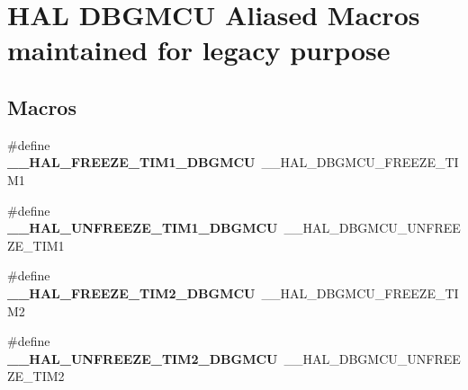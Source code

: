 \hypertarget{group___h_a_l___d_b_g_m_c_u___aliased___macros}{\section{H\-A\-L D\-B\-G\-M\-C\-U Aliased Macros maintained for legacy purpose}
\label{group___h_a_l___d_b_g_m_c_u___aliased___macros}
}
\subsection*{Macros}
\begin{DoxyCompactItemize}
\item 
\hypertarget{group___h_a_l___d_b_g_m_c_u___aliased___macros_gac0c5e626811757be9054cdeef7df4980}{\#define {\bfseries \-\_\-\-\_\-\-H\-A\-L\-\_\-\-F\-R\-E\-E\-Z\-E\-\_\-\-T\-I\-M1\-\_\-\-D\-B\-G\-M\-C\-U}~\-\_\-\-\_\-\-H\-A\-L\-\_\-\-D\-B\-G\-M\-C\-U\-\_\-\-F\-R\-E\-E\-Z\-E\-\_\-\-T\-I\-M1}\label{group___h_a_l___d_b_g_m_c_u___aliased___macros_gac0c5e626811757be9054cdeef7df4980}

\item 
\hypertarget{group___h_a_l___d_b_g_m_c_u___aliased___macros_ga331504a5985db6b71dfbb29a4fc4d670}{\#define {\bfseries \-\_\-\-\_\-\-H\-A\-L\-\_\-\-U\-N\-F\-R\-E\-E\-Z\-E\-\_\-\-T\-I\-M1\-\_\-\-D\-B\-G\-M\-C\-U}~\-\_\-\-\_\-\-H\-A\-L\-\_\-\-D\-B\-G\-M\-C\-U\-\_\-\-U\-N\-F\-R\-E\-E\-Z\-E\-\_\-\-T\-I\-M1}\label{group___h_a_l___d_b_g_m_c_u___aliased___macros_ga331504a5985db6b71dfbb29a4fc4d670}

\item 
\hypertarget{group___h_a_l___d_b_g_m_c_u___aliased___macros_ga94f02b5b50bb79574876c05eb507607b}{\#define {\bfseries \-\_\-\-\_\-\-H\-A\-L\-\_\-\-F\-R\-E\-E\-Z\-E\-\_\-\-T\-I\-M2\-\_\-\-D\-B\-G\-M\-C\-U}~\-\_\-\-\_\-\-H\-A\-L\-\_\-\-D\-B\-G\-M\-C\-U\-\_\-\-F\-R\-E\-E\-Z\-E\-\_\-\-T\-I\-M2}\label{group___h_a_l___d_b_g_m_c_u___aliased___macros_ga94f02b5b50bb79574876c05eb507607b}

\item 
\hypertarget{group___h_a_l___d_b_g_m_c_u___aliased___macros_gaf710a524a97565d4a117321ce7a6571c}{\#define {\bfseries \-\_\-\-\_\-\-H\-A\-L\-\_\-\-U\-N\-F\-R\-E\-E\-Z\-E\-\_\-\-T\-I\-M2\-\_\-\-D\-B\-G\-M\-C\-U}~\-\_\-\-\_\-\-H\-A\-L\-\_\-\-D\-B\-G\-M\-C\-U\-\_\-\-U\-N\-F\-R\-E\-E\-Z\-E\-\_\-\-T\-I\-M2}\label{group___h_a_l___d_b_g_m_c_u___aliased___macros_gaf710a524a97565d4a117321ce7a6571c}


\end{DoxyCompactItemize}
